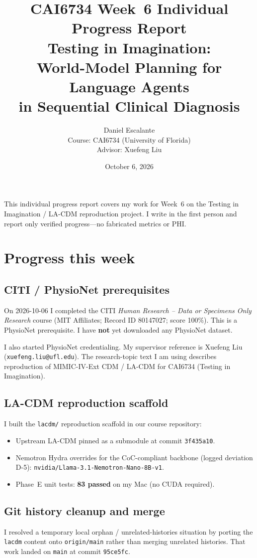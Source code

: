 \documentclass[11pt,letterpaper]{article}
\title{\textbf{CAI6734 Week~6 Individual Progress Report}\\[0.35em]
\large Testing in Imagination:\\
World-Model Planning for Language Agents\\
in Sequential Clinical Diagnosis}
\author{Daniel Escalante\\[0.4em]
\small Course: CAI6734 (University of Florida)\\
Advisor: Xuefeng Liu}
\date{October 6, 2026}
\begin{document}
\maketitle
\thispagestyle{empty}

\noindent
This individual progress report covers my work for Week~6 on the Testing in Imagination / LA-CDM reproduction project. I write in the first person and report only verified progress---no fabricated metrics or PHI.

\section{Progress this week}

\subsection{CITI / PhysioNet prerequisites}
On 2026-10-06 I completed the CITI \emph{Human Research -- Data or Specimens Only Research} course (MIT Affiliates; Record ID 80147027; score 100\%). This is a PhysioNet prerequisite. I have \textbf{not} yet downloaded any PhysioNet dataset.

I also started PhysioNet credentialing. My supervisor reference is Xuefeng Liu (\texttt{xuefeng.liu@ufl.edu}). The research-topic text I am using describes reproduction of MIMIC-IV-Ext CDM / LA-CDM for CAI6734 (Testing in Imagination).

\subsection{LA-CDM reproduction scaffold}
I built the \texttt{lacdm/} reproduction scaffold in our course repository:
\begin{itemize}
  \item Upstream LA-CDM pinned as a submodule at commit \texttt{3f435a10}.
  \item Nemotron Hydra overrides for the CoC-compliant backbone (logged deviation D-5): \texttt{nvidia/Llama-3.1-Nemotron-Nano-8B-v1}.
  \item Phase~E unit tests: \textbf{83 passed} on my Mac (no CUDA required).
\end{itemize}

\subsection{Git history cleanup and merge}
I resolved a temporary local orphan / unrelated-histories situation by porting the \texttt{lacdm} content onto \texttt{origin/main} rather than merging unrelated histories. That work landed on \texttt{main} at commit \texttt{95ce5fc}.
\end{document}
